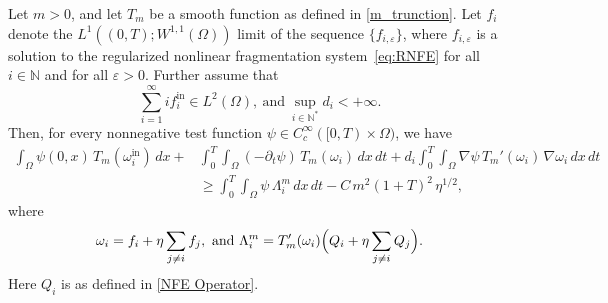 \documentclass[10pt,a4paper]{amsart}
\begin{document}
	\begin{prop}\label{epsilon compactness in the inequation}
		Let $m>0$, and let $T_m$ be a smooth function as defined in \eqref{m_trunction}. Let $f_i$ 
		denote the $L^1((0,T); W^{1,1}(\Omega))$ limit of the sequence $\{f_{i,\varepsilon}\}$, 
		where $f_{i,\varepsilon}$ is a solution to the regularized nonlinear fragmentation system~\eqref{eq:RNFE} 
		for all $i \in \mathbb{N}$ and for all $\varepsilon > 0$. Further assume that
		\[
		\sum_{i=1}^{\infty} i f_i^{\mathrm{in}} \in L^2(\Omega),
		\ \text{and} \ 
		\sup_{i\in\mathbb{N}^*} d_i < +\infty.
		\]
		Then, for every nonnegative test function 
		$\psi \in C_c^\infty([0,T)\times\Omega)$, we have
		\begin{align}\label{control estimate on epsilon}
			\int_{\Omega} \psi(0,x)\,T_m(\omega_i^{\mathrm{in}})\,dx
			+&
			\int_{0}^{T}\!\!\int_{\Omega} (-\partial_t\psi)\,T_m(\omega_i)\,dx\,dt
			+
			d_i \int_{0}^{T}\!\!\int_{\Omega} \nabla\psi \, T_m'(\omega_i) \, \nabla\omega_i \,dx\,dt 
			\nonumber  \\
			&\ge
			\int_{0}^{T}\!\!\int_{\Omega} \psi\,\Lambda^m_i\,dx\,dt
			-
			C\,m^2(1+T)^2\,\eta^{1/2},
		\end{align}
		where
		\[
		\omega_i = f_i + \eta \sum_{j\ne i} f_j, 
		\ \text{and} \ 
		\Lambda^m_i = T_m'(\omega_i) \Bigl( Q_i + \eta \sum_{j\ne i} Q_j \Bigr).
		\]
		Here $Q_i$ is as defined in \eqref{NFE Operator}.
	\end{prop}
\end{document}
